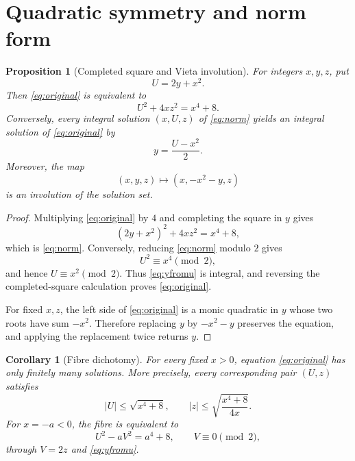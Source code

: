 \documentclass[11pt]{article}
\newtheorem{proposition}[theorem]{Proposition}
\newtheorem{corollary}[theorem]{Corollary}
\theoremstyle{remark}
\begin{document}
\section{Quadratic symmetry and norm form}

\begin{proposition}[Completed square and Vieta involution]\label{prop:norm}
For integers $x,y,z$, put
\[
 U=2y+x^2.
\]
Then \eqref{eq:original} is equivalent to
\begin{equation}\label{eq:norm}
 U^2+4xz^2=x^4+8.
\end{equation}
Conversely, every integral solution $(x,U,z)$ of \eqref{eq:norm} yields an integral solution of \eqref{eq:original} by
\begin{equation}\label{eq:yfromu}
 y=\frac{U-x^2}{2}.
\end{equation}
Moreover, the map
\begin{equation}\label{eq:vieta}
 (x,y,z)\longmapsto (x,-x^2-y,z)
\end{equation}
is an involution of the solution set.
\end{proposition}

\begin{proof}
Multiplying \eqref{eq:original} by $4$ and completing the square in $y$ gives
\[
 (2y+x^2)^2+4xz^2=x^4+8,
\]
which is \eqref{eq:norm}.  Conversely, reducing \eqref{eq:norm} modulo $2$ gives
\[
 U^2\equiv x^4\pmod2,
\]
and hence $U\equiv x^2\pmod2$.  Thus \eqref{eq:yfromu} is integral, and reversing the completed-square calculation proves \eqref{eq:original}.

For fixed $x,z$, the left side of \eqref{eq:original} is a monic quadratic in $y$ whose two roots have sum $-x^2$.  Therefore replacing $y$ by $-x^2-y$ preserves the equation, and applying the replacement twice returns $y$.
\end{proof}

\begin{corollary}[Fibre dichotomy]\label{cor:fibres}
For every fixed $x>0$, equation \eqref{eq:original} has only finitely many solutions.  More precisely, every corresponding pair $(U,z)$ satisfies
\[
 |U|\le\sqrt{x^4+8},
 \qquad
 |z|\le\sqrt{\frac{x^4+8}{4x}}.
\]
For $x=-a<0$, the fibre is equivalent to
\begin{equation}\label{eq:generalized-pell}
 U^2-aV^2=a^4+8,
 \qquad V\equiv0\pmod2,
\end{equation}
through $V=2z$ and \eqref{eq:yfromu}.
\end{corollary}
\end{document}
